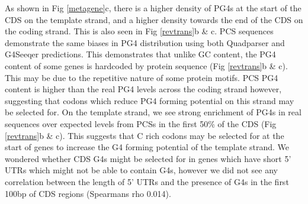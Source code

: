 \documentclass[12pt,a4paper,]{report}
\begin{document}
As shown in Fig \ref{metagene}c, there is a higher density of PG4s at
the start of the CDS on the template strand, and a higher density
towards the end of the CDS on the coding strand. This is also seen in
Fig \ref{revtrans}b \& c. PCS sequences demonstrate the same biases in
PG4 distribution using both Quadparser and G4Seeqer predictions. This
demonstrates that unlike GC content, the PG4 content of some genes is
hardcoded by protein sequence (Fig \ref{revtrans}b \& c). This may be
due to the repetitive nature of some protein motifs. PCS PG4 content is
higher than the real PG4 levels across the coding strand however,
suggesting that codons which reduce PG4 forming potential on this strand
may be selected for. On the template strand, we see strong enrichment of
PG4s in real sequences over expected levels from PCSs in the first 50\%
of the CDS (Fig \ref{revtrans}b \& c). This suggests that C rich codons
may be selected for at the start of genes to increase the G4 forming
potential of the template strand. We wondered whether CDS G4s might be
selected for in genes which have short 5' UTRs which might not be able
to contain G4s, however we did not see any correlation between the
length of 5' UTRs and the presence of G4s in the first 100bp of CDS
regions (Spearmans rho 0.014).

\newpage
\end{document}
